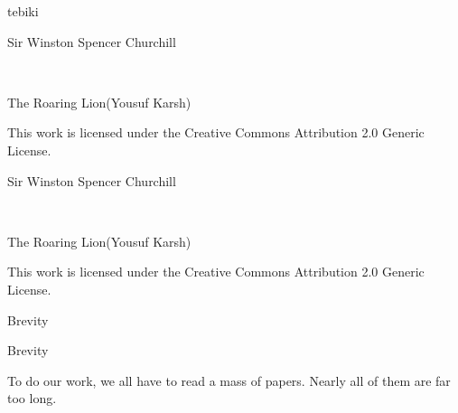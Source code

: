 \documentclass[
  ignorenonframetext,
]{beamer}
\begin{document}
\begin{frame}{tebiki}
\protect\hypertarget{tebiki}{}
\vspace*{-20pt}
\end{frame}

\begin{frame}{Sir Winston Spencer Churchill}
\protect\hypertarget{sir-winston-spencer-churchill}{}
\raggedleft\Huge


\tiny

\raggedleft

The Roaring Lion(Yousuf Karsh) \vspace{-5pt}

This work is licensed under the Creative Commons Attribution 2.0 Generic
License.
\end{frame}

\begin{frame}{Sir Winston Spencer Churchill}
\protect\hypertarget{sir-winston-spencer-churchill-1}{}
\raggedleft\Huge


\tiny

\raggedleft

The Roaring Lion(Yousuf Karsh) \vspace{-5pt}

This work is licensed under the Creative Commons Attribution 2.0 Generic
License.
\end{frame}

\begin{frame}{Brevity}
\protect\hypertarget{brevity}{}
\centering
\vspace*{-21.5pt}
\end{frame}

\begin{frame}{Brevity}
\protect\hypertarget{brevity-1}{}
\Large

To do our work, we all have to read a mass of papers. Nearly all of them
are far too long.

\par

\vfill
\Huge


\vfill
\end{frame}
\end{document}
